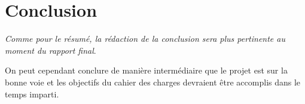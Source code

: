 \chapter{Conclusion}

\textit{Comme pour le résumé, la rédaction de la conclusion sera plus pertinente au moment du rapport final}.

On peut cependant conclure de manière intermédiaire que le projet est sur la bonne voie et les objectifs du cahier des charges devraient être accomplis dans le temps imparti.









\vfil
\hspace{8cm}\makeatletter\@author\makeatother\par
\hspace{8cm}\begin{minipage}{5cm}
    \printsignature
\end{minipage}